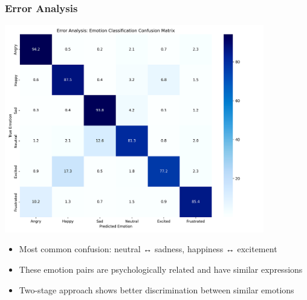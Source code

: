 \begin{frame}
\frametitle{Error Analysis}
\begin{center}
\includegraphics[width=0.85\textwidth]{figures/error_analysis.png}
\end{center}

\begin{itemize}
    \item Most common confusion: neutral ↔ sadness, happiness ↔ excitement
    \item These emotion pairs are psychologically related and have similar expressions
    \item Two-stage approach shows better discrimination between similar emotions
\end{itemize}
\end{frame}

